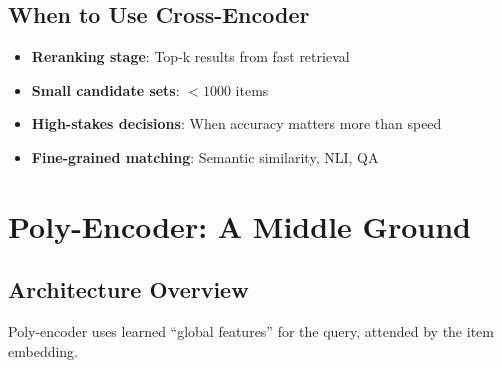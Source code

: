 \subsection{When to Use Cross-Encoder}

\begin{itemize}
    \item \textbf{Reranking stage}: Top-k results from fast retrieval
    \item \textbf{Small candidate sets}: $< 1000$ items
    \item \textbf{High-stakes decisions}: When accuracy matters more than speed
    \item \textbf{Fine-grained matching}: Semantic similarity, NLI, QA
\end{itemize}

\section{Poly-Encoder: A Middle Ground}
\label{sec:poly_encoder}

\subsection{Architecture Overview}

Poly-encoder uses learned ``global features'' for the query, attended by the item embedding.

